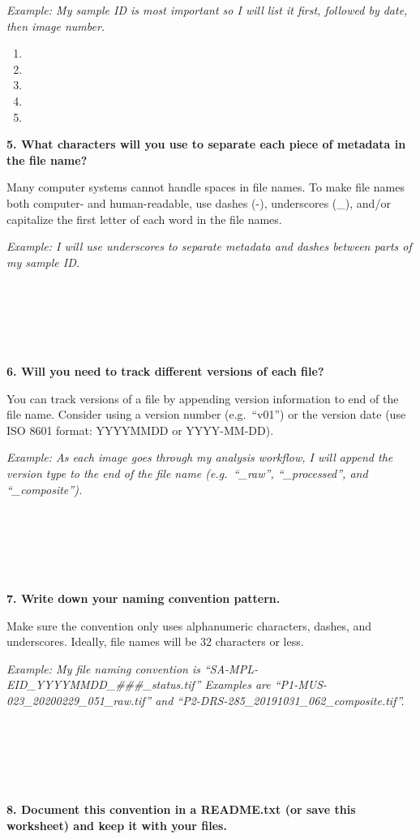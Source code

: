 \documentclass[
]{book}
\providecommand{\tightlist}{%
  \setlength{\itemsep}{0pt}\setlength{\parskip}{0pt}}
\begin{document}
\emph{Example: My sample ID is most important so I will list it first, followed by date, then image number.}

\begin{enumerate}
\def\labelenumi{\arabic{enumi}.}
\tightlist
\item
\item
\item
\item
\item
\end{enumerate}

\textbf{5. What characters will you use to separate each piece of metadata in the file name?}

Many computer systems cannot handle spaces in file names. To make file names both computer- and human-readable, use dashes (-), underscores (\_), and/or capitalize the first letter of each word in the file names.

\emph{Example: I will use underscores to separate metadata and dashes between parts of my sample ID.}

~

~

~

\textbf{6. Will you need to track different versions of each file?}

You can track versions of a file by appending version information to end of the file name. Consider using a version number (e.g.~``v01'') or the version date (use ISO 8601 format: YYYYMMDD or YYYY-MM-DD).

\emph{Example: As each image goes through my analysis workflow, I will append the version type to the end of the file name (e.g.~``\_raw'', ``\_processed'', and ``\_composite'').}

~

~

~

\textbf{7. Write down your naming convention pattern.}

Make sure the convention only uses alphanumeric characters, dashes, and underscores. Ideally, file names will be 32 characters or less.

\emph{Example: My file naming convention is ``SA-MPL-EID\_YYYYMMDD\_\#\#\#\_status.tif'' Examples are ``P1-MUS-023\_20200229\_051\_raw.tif'' and ``P2-DRS-285\_20191031\_062\_composite.tif''.}

~

~

~

\textbf{8. Document this convention in a README.txt (or save this worksheet) and keep it with your files.}
\end{document}
